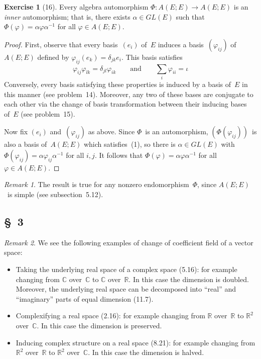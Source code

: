 \documentclass[letterpaper,12pt]{article}
\newcommand{\R}{\mathbb{R}}
\newcommand{\C}{\mathbb{C}}
\theoremstyle{definition}
\newtheorem*{exer}{Exercise}
\theoremstyle{remark}
\newtheorem*{rmk}{Remark}
\begin{document}
\begin{exer}[16]
Every algebra automorphism \(\Phi:A(E;E)\to A(E;E)\) is an \emph{inner} automorphism; that is, there exists \(\alpha\in GL(E)\) such that \(\Phi(\varphi)=\alpha\varphi\alpha^{-1}\) for all \(\varphi\in A(E;E)\).
\end{exer}
\begin{proof}
First, observe that every basis~\((e_i)\) of~\(E\) induces a basis~\((\varphi_{ij})\) of~\(A(E;E)\) defined by \(\varphi_{ij}(e_k)=\delta_{jk}e_i\). This basis satisfies
\[\varphi_{ij}\varphi_{lk}=\delta_{jl}\varphi_{ik}\qquad\text{and}\qquad\sum_i\varphi_{ii}=\iota\tag{1}\]
Conversely, every basis satisfying these properties is induced by a basis of~\(E\) in this manner (see problem~14). Moreover, any two of these bases are conjugate to each other via the change of basis transformation between their inducing bases of~\(E\) (see problem~15).

Now fix \((e_i)\) and~\((\varphi_{ij})\) as above. Since \(\Phi\)~is an automorphism, \((\Phi(\varphi_{ij}))\)~is also a basis of~\(A(E;E)\) which satisfies~(1), so there is \(\alpha\in GL(E)\) with \(\Phi(\varphi_{ij})=\alpha\varphi_{ij}\alpha^{-1}\) for all \(i,j\). It follows that \(\Phi(\varphi)=\alpha\varphi\alpha^{-1}\) for all \(\varphi\in A(E;E)\).
\end{proof}
\begin{rmk}
The result is true for any nonzero endomorphism~\(\Phi\), since \(A(E;E)\)~is simple (see subsection~5.12).
\end{rmk}

\subsection*{\S~3}
\begin{rmk}
We see the following examples of change of coefficient field of a vector space:
\begin{itemize}
\item Taking the underlying real space of a complex space (5.16): for example changing from \(\C\) over~\(\C\) to \(\C\) over~\(\R\). In this case the dimension is doubled. Moreover, the underlying real space can be decomposed into ``real'' and ``imaginary'' parts of equal dimension (11.7).
\item Complexifying a real space (2.16): for example changing from \(\R\) over~\(\R\) to \(\R^2\) over~\(\C\). In this case the dimension is preserved.
\item Inducing complex structure on a real space (8.21): for example changing from \(\R^2\) over~\(\R\) to \(\R^2\) over~\(\C\). In this case the dimension is halved.
\end{itemize}
\end{rmk}
\end{document}
